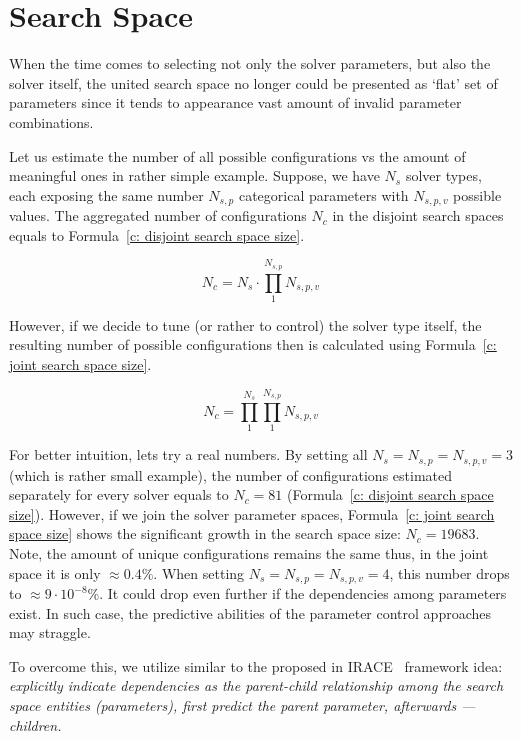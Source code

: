 \section{Search Space}\label{concept:search space}
When the time comes to selecting not only the solver parameters, but also the solver itself, the united search space no longer could be presented as `flat' set of parameters since it tends to appearance vast amount of invalid parameter combinations.

Let us estimate the number of all possible configurations vs the amount of meaningful ones in rather simple example.
Suppose, we have $N_s$ solver types, each exposing the same number $N_{s,p}$ categorical parameters with $N_{s,p,v}$ possible values. The aggregated number of configurations $N_c$ in the disjoint search spaces equals to Formula~\ref{c: disjoint search space size}.

\begin{equation}
N_c = N_s \cdot \prod_{1}^{N_{s,p}} N_{s,p,v}
\label{c: disjoint search space size}
\end{equation}

However, if we decide to tune (or rather to control) the solver type itself, the resulting number of possible configurations then is calculated using Formula~\ref{c: joint search space size}.

\begin{equation}
N_c = \prod_{1}^{N_{s}} \prod_{1}^{N_{s,p}} N_{s,p,v}
\label{c: joint search space size}
\end{equation}

For better intuition, lets try a real numbers. By setting all $N_s = N_{s,p} = N_{s,p,v} = 3$ (which is rather small example), the number of configurations estimated separately for every solver equals to $N_c = 81$ (Formula~\ref{c: disjoint search space size}). However, if we join the solver parameter spaces, Formula~\ref{c: joint search space size} shows the significant growth in the search space size: $N_c = 19683$. Note, the amount of unique configurations remains the same thus, in the joint space it is only $\approx 0.4\%$. When setting $N_s = N_{s,p} = N_{s,p,v} = 4$, this number drops to $\approx 9 \cdot 10^{-8}\%$. It could drop even further if the dependencies among parameters exist. In such case, the predictive abilities of the parameter control approaches may straggle.

To overcome this, we utilize similar to the proposed in IRACE~\cite{lopez2016irace} framework idea: \emph{explicitly indicate dependencies as the parent-child relationship among the search space entities (parameters), first predict the parent parameter, afterwards — children.}



